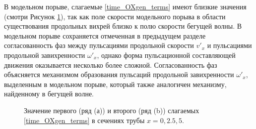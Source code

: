 В модельном порыве, слагаемые \eqref{time_OXgen_terms} имеют близкие значения (смотри Рисунок \ref{OXgen_terms_cmp_pic}), так как поле скорости модельного порыва в области существования продольных вихрей близко к полю скорости бегущей волны. В модельном порыве сохраняется отмеченная в предыдущем разделе согласованность фаз между пульсациями продольной скорости $v'_x$ и пульсациями продольной завихренности $\omega'_x$, однако форма пульсационной составляющей движения оказывается несколько более сложной. Согласованность фаз объясняется механизмом образования пульсаций продольной завихренности $\omega'_x$, выделенным в модельном порыве, который также аналогичен механизму, найденному в бегущей волне. 


\begin{figure}[h]
\caption{Значение первого (ряд (а)) и второго (ряд (b)) слагаемых \eqref{time_OXgen_terms} в сечениях трубы $x=0,2.5,5$. }
\label{OXgen_terms_cmp_pic}
\end{figure}


